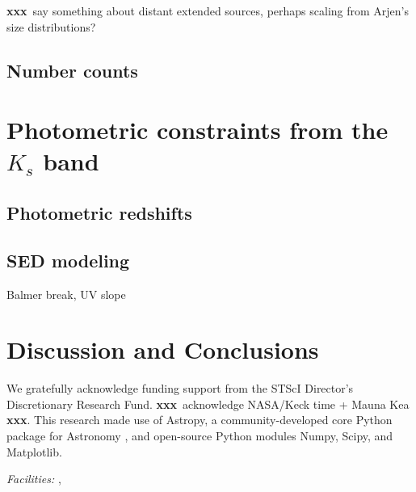 \documentclass[iop, numberedappendix]{emulateapj}
\gdef\xxx{\textbf{xxx}}
\begin{document}
\xxx\ say something about distant extended sources, perhaps scaling from Arjen's size distributions?

\subsection{Number counts}
\label{s:number}

\section{Photometric constraints from the $K_s$ band}
\label{s:constraints}

\subsection{Photometric redshifts}
\label{s:photoz}

\subsection{SED modeling}
\label{s:sed}

Balmer break, UV slope


\section{Discussion and Conclusions}
\label{s:discussion}


%
%
\vspace{-0.3cm} %
\acknowledgements

\noindent We gratefully acknowledge funding support from the STScI Director's Discretionary Research Fund.  \xxx\ acknowledge NASA/Keck time + Mauna Kea \xxx. This research made use of Astropy, a community-developed core Python package for Astronomy \citep{astropy}, and open-source Python modules Numpy, Scipy, and Matplotlib. 


{\it Facilities:} ,  %



\end{document}
